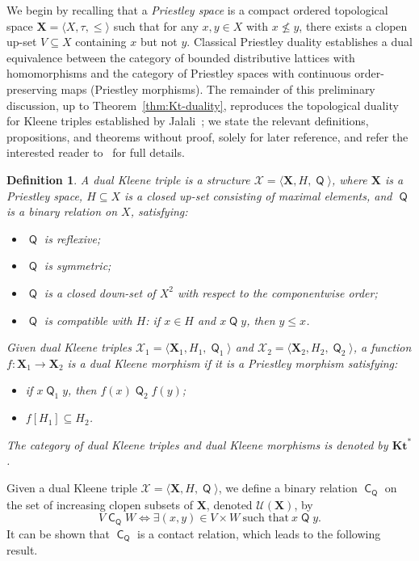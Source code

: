 \documentclass{article}
\newtheorem{definition}[theorem]{Definition}
\DeclareMathOperator{\con}{\mathsf{C}}
\DeclareMathOperator{\Q}{\mathsf{Q}}
\newcommand{\X}{\mathbf{X}}
\newcommand{\U}{\mathcal{U}}
\begin{document}
We begin by recalling that a \emph{Priestley space} is a compact ordered topological space $\X = \langle X, \tau, \leq \rangle$ such that for any $x,y \in X$ with $x \not\leq y$, there exists a clopen up-set $V \subseteq X$ containing $x$ but not $y$. Classical Priestley duality establishes a dual equivalence between the category of bounded distributive lattices with homomorphisms and the category of Priestley spaces with continuous order-preserving maps (Priestley morphisms). The remainder of this preliminary discussion, up to Theorem~\ref{thm:Kt-duality}, reproduces the topological duality for Kleene triples established by Jalali~\cite{jalali}; we state the relevant definitions, propositions, and theorems without proof, solely for later reference, and refer the interested reader to~\cite{jalali, viglizzo99algebras} for full details.

\begin{definition}
\label{def:dual-kleene-triple}
A \emph{dual Kleene triple} is a structure $\mathcal{X}=\langle \X, H, \Q \rangle$, where $\X$ is a Priestley space, $H\subseteq X$ is a closed up-set consisting of maximal elements, and $\Q$ is a binary relation on $X$, satisfying:
\begin{itemize}
    \item $\Q$ is reflexive;
    \item $\Q$ is symmetric;
    \item $\Q$ is a closed down-set of $X^2$ with respect to the componentwise order;
    \item $\Q$ is compatible with $H$: if $x\in H$ and $x\Q y$, then $y\le x$.
\end{itemize}

Given dual Kleene triples $\mathcal{X}_1=\langle \X_1,H_1,\Q_1\rangle$ and $\mathcal{X}_2=\langle \X_2,H_2,\Q_2\rangle$, a function $f \colon \X_1 \to \X_2$ is a \emph{dual Kleene morphism} if it is a Priestley morphism satisfying:
\begin{itemize}
    \item if $x \Q_1 y$, then $f(x) \Q_2 f(y)$;
    \item $f[H_1]\subseteq H_2$.
\end{itemize}

The category of dual Kleene triples and dual Kleene morphisms is denoted by $\mathbf{Kt}^{*}$.
\end{definition}

Given a dual Kleene triple $\mathcal{X}=\langle \X, H, \Q \rangle$, we define a binary relation $\con_{\Q}$ on the set of increasing clopen subsets of $\X$, denoted $\U(\X)$, by
\[
    V \con_{\Q} W \iff \exists (x,y) \in V \times W \ \text{such that} \ x\Q y.
\]
It can be shown that $\con_{\Q}$ is a contact relation, which leads to the following result.
\end{document}
